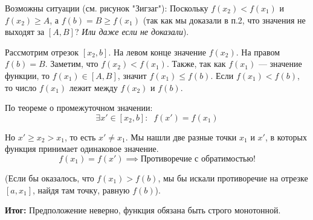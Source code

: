 \begin{tcolorbox}[title=Доказательство]
\begin{enumerate}
        Возможны ситуации (см. рисунок "Зигзаг"):
        Поскольку $f(x_2) < f(x_1)$ и $f(x_2) \ge A$, а $f(b) = B \ge f(x_1)$ (так как мы доказали в п.2, что значения не выходят за $[A, B]$? \textit{Или даже если не доказали}).
        
        Рассмотрим отрезок $[x_2, b]$.
        На левом конце значение $f(x_2)$. На правом $f(b) = B$.
        Заметим, что $f(x_2) < f(x_1)$.
        Также, так как $f(x_1)$ — значение функции, то $f(x_1) \in [A, B]$, значит $f(x_1) \le f(b)$.
        Если $f(x_1) < f(b)$, то число $f(x_1)$ лежит между $f(x_2)$ и $f(b)$.
        
        По теореме о промежуточном значении:
        \[ \exists x' \in [x_2, b]: \;\; f(x') = f(x_1) \]
        
        Но $x' \ge x_2 > x_1$, то есть $x' \neq x_1$.
        Мы нашли две разные точки $x_1$ и $x'$, в которых функция принимает одинаковое значение.
        \[ f(x_1) = f(x') \implies \text{Противоречие с обратимостью!} \]
        
        (Если бы оказалось, что $f(x_1) > f(b)$, мы бы искали противоречие на отрезке $[a, x_1]$, найдя там точку, равную $f(b)$).
        
        \begin{center}
        \end{center}
    \end{enumerate}
    \textbf{Итог:} Предположение неверно, функция обязана быть строго монотонной.
\end{tcolorbox}
